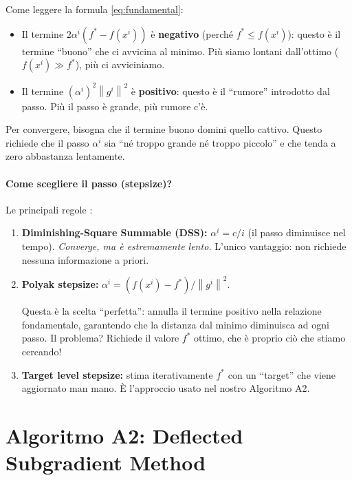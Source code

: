 \documentclass[a4paper,11pt]{article}
\theoremstyle{definition}
\newcommand{\norm}[1]{\left\lVert #1 \right\rVert}
\begin{document}
\begin{intuizione}
Come leggere la formula \eqref{eq:fundamental}:
\begin{itemize}[nosep]
  \item Il termine $2\alpha^i(f^* - f(x^i))$ è \textbf{negativo} (perché $f^* \leq f(x^i)$): questo è il termine ``buono'' che ci avvicina al minimo. Più siamo lontani dall'ottimo ($f(x^i) \gg f^*$), più ci avviciniamo.
  \item Il termine $(\alpha^i)^2\norm{g^i}^2$ è \textbf{positivo}: questo è il ``rumore'' introdotto dal passo. Più il passo è grande, più rumore c'è.
\end{itemize}
Per convergere, bisogna che il termine buono domini quello cattivo. Questo richiede che il passo $\alpha^i$ sia ``né troppo grande né troppo piccolo'' e che tenda a zero abbastanza lentamente.
\end{intuizione}

\paragraph{Come scegliere il passo (stepsize)?} Le principali regole \cite[slide~10--14, set~5]{opt-slides}:

\begin{enumerate}
  \item \textbf{Diminishing-Square Summable (DSS):} $\alpha^i = c/i$ (il passo diminuisce nel tempo). \emph{Converge, ma è estremamente lento.} L'unico vantaggio: non richiede nessuna informazione a priori.

  \item \textbf{Polyak stepsize:} $\alpha^i = (f(x^i) - f^*) / \norm{g^i}^2$.
  \begin{intuizione}
  Questa è la scelta ``perfetta'': annulla il termine positivo nella relazione fondamentale, garantendo che la distanza dal minimo diminuisca ad ogni passo. Il problema? Richiede il valore $f^*$ ottimo, che è proprio ciò che stiamo cercando!
  \end{intuizione}

  \item \textbf{Target level stepsize:} stima iterativamente $f^*$ con un ``target'' che viene aggiornato man mano. È l'approccio usato nel nostro Algoritmo A2.
\end{enumerate}

\section{Algoritmo A2: Deflected Subgradient Method}
\label{sec:deflected}
\end{document}
